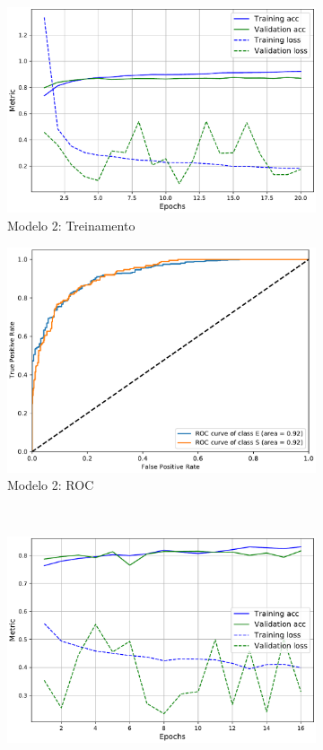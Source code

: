 \begin{figure}[!t]
\begin{subfigure}{.5\textwidth}
    \includegraphics[width=.98\linewidth,left]{figures/sdss_pretrained_train.pdf}
    \caption{Modelo 2: Treinamento}
    \label{fig:mod2_treinamento}
  \end{subfigure}%
  \begin{subfigure}{.5\textwidth}
    \includegraphics[width=.98\linewidth,right]{figures/roc_sdss_pretrained.pdf}
    \caption{Modelo 2: ROC}
    \label{fig:mod2_roc}
  \end{subfigure}\\[3mm]
  \begin{subfigure}{.5\textwidth}
    \includegraphics[width=.98\linewidth,left]{figures/splus_train.pdf}

\end{subfigure}
\end{figure}

